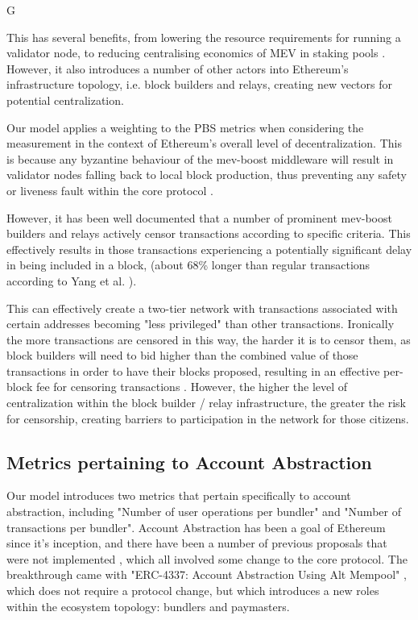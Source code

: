 G\documentclass[conference]{IEEEtran}
\begin{document}
This has several benefits, from lowering the resource requirements for running a validator node, to reducing centralising economics of MEV in staking pools \cite{buterin2021}.  However, it also introduces a number of other actors into Ethereum's infrastructure topology, i.e. block builders and relays, creating new vectors for potential centralization.

Our model applies a weighting to the PBS metrics when considering the measurement in the context of Ethereum's overall level of decentralization.  This is because any byzantine behaviour of the mev-boost middleware will result in validator nodes falling back to local block production, thus preventing any safety or liveness fault within the core protocol \cite{hasu2022}.

However, it has been well documented \cite{labrys2022} that a number of prominent mev-boost builders and relays actively censor transactions according to specific criteria.  This effectively results in those transactions experiencing a potentially significant delay in being included in a block, (about 68\% longer than regular transactions according to Yang et al. \cite{yang2022sok}). 

This can effectively create a two-tier network with transactions associated with certain addresses becoming "less privileged" than other transactions.  Ironically the more transactions are censored in this way, the harder it is to censor them, as block builders will need to bid higher than the combined value of those transactions in order to have their blocks proposed, resulting in an effective per-block fee for censoring transactions \cite{buterin2022}.  However, the higher the level of centralization within the block builder / relay infrastructure, the greater the risk for censorship, creating barriers to participation in the network for those citizens.

\subsection{Metrics pertaining to Account Abstraction}

Our model introduces two metrics that pertain specifically to account abstraction, including "Number of user operations per bundler" and "Number of transactions per bundler". Account Abstraction has been a goal of Ethereum since it's inception, and there have been a number of previous proposals that were not implemented \cite{john2023, wilson2020, dietrichs2020}, which all involved some change to the core protocol.  The breakthrough came with "ERC-4337: Account Abstraction Using Alt Mempool" \cite{buterin2021B}, which does not require a protocol change, but which introduces a new roles within the ecosystem topology: bundlers and paymasters.
\end{document}
